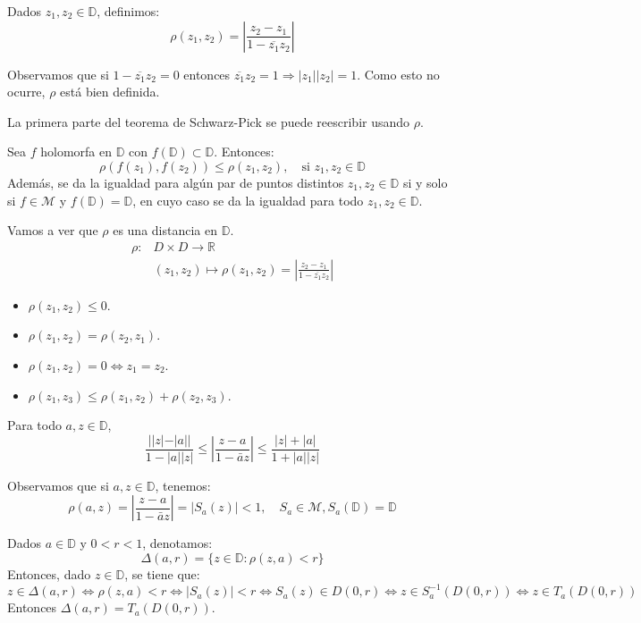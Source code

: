 \begin{definition}
    Dados $z_1, z_2 \in \mathbb{D}$, definimos:
    $$\rho(z_1, z_2) = \left|\frac{z_2-z_1}{1-\overline{z_1}z_2}\right|$$

    Observamos que si $1-\overline{z_1}z_2 = 0$ entonces $\overline{z_1}z_2 = 1 \Rightarrow |z_1||z_2| = 1$.
    Como esto no ocurre, $\rho$ está bien definida.
\end{definition}

La primera parte del teorema de Schwarz-Pick se puede reescribir usando $\rho$.

Sea $f$ holomorfa en $\mathbb{D}$ con $f(\mathbb{D}) \subset \mathbb{D}$.
Entonces:
$$\rho(f(z_1), f(z_2)) \leq \rho(z_1, z_2), \quad \text{si } z_1, z_2 \in \mathbb{D}$$
Además, se da la igualdad para algún par de puntos distintos $z_1, z_2 \in \mathbb{D}$ si y solo si $f \in \mathcal{M}$ y $f(\mathbb{D}) = \mathbb{D}$, en cuyo caso se da la igualdad para todo $z_1, z_2 \in \mathbb{D}$.

Vamos a ver que $\rho$ es una distancia en $\mathbb{D}$.
\begin{align*}
    \rho: & D \times D \to \mathbb{R}                                                            \\
          & (z_1, z_2) \mapsto \rho(z_1, z_2) = \left|\frac{z_2-z_1}{1-\overline{z_1}z_2}\right|
\end{align*}

\begin{itemize}
    \item $\rho(z_1, z_2) \leq 0$.
    \item $\rho(z_1, z_2) = \rho(z_2, z_1)$.
    \item $\rho(z_1, z_2) = 0 \Leftrightarrow z_1 = z_2$.
    \item $\rho(z_1, z_3) \leq \rho(z_1, z_2) + \rho(z_2, z_3)$.
\end{itemize}

\begin{lemma}
    Para todo $a, z \in \mathbb{D}$,
    $$\frac{||z|-|a||}{1-|a||z|} \leq \left|\frac{z-a}{1-\bar{a}z}\right| \leq \frac{|z|+|a|}{1+|a||z|}$$
\end{lemma}

Observamos que si $a, z \in \mathbb{D}$, tenemos:
$$\rho(a, z) = \left|\frac{z-a}{1-\bar{a}z}\right| = |S_a(z)| < 1, \quad S_a \in \mathcal{M}, S_a(\mathbb{D}) = \mathbb{D}$$

Dados $a \in \mathbb{D}$ y $0 < r < 1$, denotamos:
$$\Delta(a, r) = \{z \in \mathbb{D} : \rho(z, a) < r\}$$
Entonces, dado $z \in \mathbb{D}$, se tiene que:
$$z \in \Delta(a, r) \Leftrightarrow \rho(z, a) < r \Leftrightarrow |S_a(z)| < r \Leftrightarrow S_a(z) \in D(0, r) \Leftrightarrow z \in S_a^{-1}(D(0, r)) \Leftrightarrow z \in T_a(D(0, r))$$
Entonces $\Delta(a, r) = T_a(D(0, r))$.

